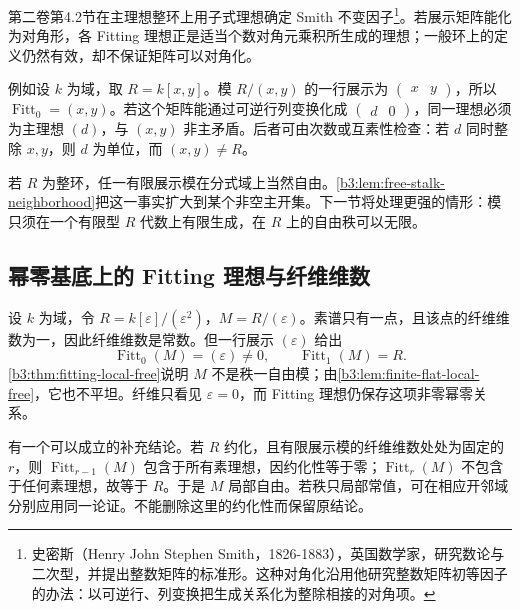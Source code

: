 第二卷第4.2节在主理想整环上用子式理想确定 Smith 不变因子\footnote{史密斯（Henry John Stephen Smith，1826-1883），英国数学家，研究数论与二次型，并提出整数矩阵的标准形。这种对角化沿用他研究整数矩阵初等因子的办法：以可逆行、列变换把生成关系化为整除相接的对角项。}。若展示矩阵能化为对角形，各 Fitting 理想正是适当个数对角元乘积所生成的理想；一般环上的定义仍然有效，却不保证矩阵可以对角化。

\ProseParagraphBreak
例如设 \(k\) 为域，取 \(R=k[x,y]\)。模 \(R/(x,y)\) 的一行展示为 \(\begin{pmatrix}x&y\end{pmatrix}\)，所以 \(\operatorname{Fitt}_0=(x,y)\)。若这个矩阵能通过可逆行列变换化成 \(\begin{pmatrix}d&0\end{pmatrix}\)，同一理想必须为主理想 \((d)\)，与 \((x,y)\) 非主矛盾。后者可由次数或互素性检查：若 \(d\) 同时整除 \(x,y\)，则 \(d\) 为单位，而 \((x,y)\ne R\)。

\ProseParagraphBreak
若 \(R\) 为整环，任一有限展示模在分式域上当然自由。\cref{b3:lem:free-stalk-neighborhood}把这一事实扩大到某个非空主开集。下一节将处理更强的情形：模只须在一个有限型 \(R\) 代数上有限生成，在 \(R\) 上的自由秩可以无限。

\subsection{幂零基底上的 Fitting 理想与纤维维数}
\label{b3:subsec:1203:05}

设 \(k\) 为域，令 \(R=k[\varepsilon]/(\varepsilon^2)\)，\(M=R/(\varepsilon)\)。素谱只有一点，且该点的纤维维数为一，因此纤维维数是常数。但一行展示 \((\varepsilon)\) 给出
\[
	\operatorname{Fitt}_0(M)=(\varepsilon)\ne0, \qquad \operatorname{Fitt}_1(M)=R.
\]
\cref{b3:thm:fitting-local-free}说明 \(M\) 不是秩一自由模；由\cref{b3:lem:finite-flat-local-free}，它也不平坦。纤维只看见 \(\varepsilon=0\)，而 Fitting 理想仍保存这项非零幂零关系。

\ProseParagraphBreak
有一个可以成立的补充结论。若 \(R\) 约化，且有限展示模的纤维维数处处为固定的 \(r\)，则 \(\operatorname{Fitt}_{r-1}(M)\) 包含于所有素理想，因约化性等于零；\(\operatorname{Fitt}_r(M)\) 不包含于任何素理想，故等于 \(R\)。于是 \(M\) 局部自由。若秩只局部常值，可在相应开邻域分别应用同一论证。不能删除这里的约化性而保留原结论。
